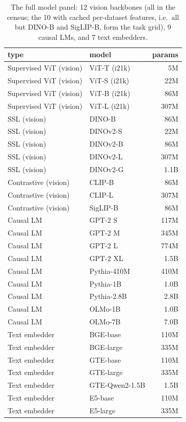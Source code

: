 \begin{table}[H]
\centering
\scriptsize
\begin{tabular}{llr}
\toprule
type & model & params \\
\midrule
Supervised ViT (vision) & ViT-T (i21k) & 5M \\
Supervised ViT (vision) & ViT-S (i21k) & 22M \\
Supervised ViT (vision) & ViT-B (i21k) & 86M \\
Supervised ViT (vision) & ViT-L (i21k) & 307M \\
SSL (vision) & DINO-B & 86M \\
SSL (vision) & DINOv2-S & 22M \\
SSL (vision) & DINOv2-B & 86M \\
SSL (vision) & DINOv2-L & 307M \\
SSL (vision) & DINOv2-G & 1.1B \\
Contrastive (vision) & CLIP-B & 86M \\
Contrastive (vision) & CLIP-L & 307M \\
Contrastive (vision) & SigLIP-B & 86M \\
\midrule
Causal LM & GPT-2 S & 117M \\
Causal LM & GPT-2 M & 345M \\
Causal LM & GPT-2 L & 774M \\
Causal LM & GPT-2 XL & 1.5B \\
Causal LM & Pythia-410M & 410M \\
Causal LM & Pythia-1B & 1.0B \\
Causal LM & Pythia-2.8B & 2.8B \\
Causal LM & OLMo-1B & 1.0B \\
Causal LM & OLMo-7B & 7.0B \\
Text embedder & BGE-base & 110M \\
Text embedder & BGE-large & 335M \\
Text embedder & GTE-base & 110M \\
Text embedder & GTE-large & 335M \\
Text embedder & GTE-Qwen2-1.5B & 1.5B \\
Text embedder & E5-base & 110M \\
Text embedder & E5-large & 335M \\
\bottomrule
\end{tabular}
\caption{The full model panel: 12 vision backbones (all in the census; the 10 with cached per-dataset features, i.e.\ all but DINO-B and SigLIP-B, form the task grid), 9 causal LMs, and 7 text embedders.}
\label{tab:a0}
\end{table}
